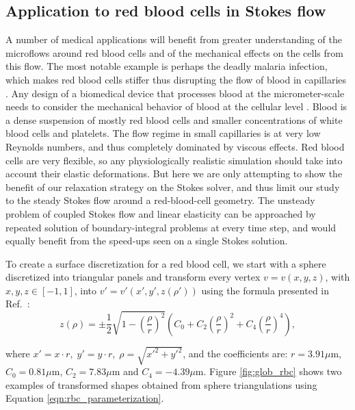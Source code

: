 \documentclass[final,3p,times]{elsarticle}
\begin{document}
\subsection{Application to red blood cells in Stokes flow}

A number of medical applications will benefit from greater understanding of the microflows around red blood cells and of the mechanical effects on the cells from this flow. 
The most notable example is perhaps the deadly malaria infection, which makes red blood cells stiffer thus disrupting the flow of blood in capillaries \cite{FedosovETal2011}.
Any design of a biomedical device that processes blood at the micrometer-scale needs to consider the mechanical behavior of blood at the cellular level \cite{Freund2014}. Blood is a dense suspension of mostly red blood cells and smaller concentrations of white blood cells and platelets. The flow regime in small capillaries is at very low Reynolds numbers, and thus completely dominated by viscous effects. 
Red blood cells are very flexible, so any physiologically realistic simulation should take into account their elastic deformations. But here we are only attempting to show the benefit of our relaxation strategy on the Stokes solver, and thus limit our study to the steady Stokes flow around a red-blood-cell geometry. The unsteady problem of coupled Stokes flow and linear elasticity can be approached by repeated solution of boundary-integral problems at every time step, and would equally benefit from the speed-ups seen on a single Stokes solution.

To create a surface discretization for a red blood cell, we start with a sphere discretized into triangular panels and transform every vertex $v = v(x,y,z)$, with $x,y,z\in [-1,1]$, into $v' = v'(x',y',z(\rho'))$ using the formula presented in Ref.~\cite{EvansFung1972}:
%
\begin{equation}
	\label{eqn:rbc_parameterization}
	z(\rho) = \pm \frac{1}{2}\sqrt{1 - \left(\frac{\rho}{r}\right)^{2}}\left ( C_0 + C_2 \left(\frac{\rho}{r}\right)^{2} + C_4\left(\frac{\rho}{r}\right)^{4}\right ),
\end{equation}

\noindent where $x' = x\cdot r,\; y' = y\cdot r,\; \rho = \sqrt{x'^{2}+y'^{2}}$, and the coefficients are: $r=3.91\mu$m,  $C_0= 0.81\mu$m, $C_2= 7.83\mu$m and $C_4=-4.39\mu$m.
Figure \ref{fig:glob_rbc} shows two examples of transformed shapes obtained from sphere triangulations using Equation \eqref{eqn:rbc_parameterization}.
\end{document}
